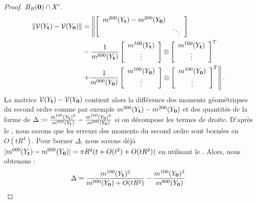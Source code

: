 \begin{proof}
  $B_{R}(\mathbf{0}) \cap X'$.
  \begin{align}
   \| \mathcal{V}( Y_{\mathbf{t}} ) - \mathcal{V}(Y_{\mathbf{0}})\|
   &= \left\| \left\lbrack \begin{array}{cc}
       m^{200}(Y_{\mathbf{t}}) - m^{200}(Y_{\mathbf{0}}) & \\
       & \ddots
     \end{array} \right\rbrack
   \right. \nonumber\\
  & - \frac{1}{m^{000}(Y_{\mathbf{t}})}
   \left\lbrack \begin{array}{c}
     m^{100}(Y_{\mathbf{t}}) \\
     \vdots
   \end{array} \right\rbrack
   \otimes
   \left\lbrack \begin{array}{c}
     m^{100}(Y_{\mathbf{t}}) \\
     \vdots
   \end{array} \right\rbrack^T
   \nonumber\\
  & \left.
   + \frac{1}{m^{000}(Y_{\mathbf{0}})}
   \left\lbrack \begin{array}{c}
     m^{100}(Y_{\mathbf{0}}) \\
     \vdots
   \end{array} \right\rbrack
   \otimes
   \left\lbrack \begin{array}{c}
     m^{100}(Y_{\mathbf{0}}) \\
     \vdots
   \end{array} \right\rbrack^T
   \right\|.
  \end{align}
  La matrice $\mathcal{V}( Y_{\mathbf{t}} ) - \mathcal{V}(Y_{\mathbf{0}})$ contient alors la
  différence des moments géométriques du second ordre comme par exemple $
  m^{200}(Y_{\mathbf{t}}) - m^{200}(Y_{\mathbf{0}})$ et des quantités de la forme
  de $\Delta := \frac{m^{100}(Y_{\mathbf{t}})^2}{m^{000}(Y_{\mathbf{t}})} -
  \frac{m^{100}(Y_{\mathbf{0}})^2}{m^{000}(Y_{\mathbf{0}})}$ si on décompose
  les termes de droite. D'après le ,
  nous savons que les erreurs des moments du second ordre sont bornées en $O(t
  R^4)$. Pour borner $\Delta$, nous savons déjà $|m^{000}(Y_{\mathbf{t}}) -
  m^{000}(Y_{\mathbf{0}})| = \pi R^2(t+O(t^2)+O(tR^2))$ en utilisant le
  . Alors, nous obtenons :
  \begin{align}
    \Delta &= \frac{\Mom{100}(Y_{\vt})^2}{\Mom{000}(Y_{\mathbf{0}}) + O(tR^2)} -
    \frac{\Mom{100}(Y_{\mathbf{0}})^2}{\Mom{000}(Y_{\mathbf{0}})}\\

\end{align}
\end{proof}

